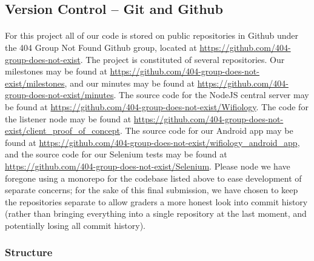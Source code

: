 \documentclass[]{article}
\begin{document}
	\subsection{Version Control -- Git and Github}
	\paragraph{} For this project all of our code is stored on public repositories in Github under the 404 Group Not Found
	Github group, located at \href{https://github.com/404-group-does-not-exist}{https://github.com/404-group-does-not-exist}.
	The project is constituted of several repositories. Our milestones may be found at \href{https://github.com/404-group-does-not-exist/milestones}{https://github.com/404-group-does-not-exist/milestones}, and our minutes may be found at 
	\href{https://github.com/404-group-does-not-exist/minutes}{https://github.com/404-group-does-not-exist/minutes}. The source
	code for the NodeJS central server may be found at \href{https://github.com/404-group-does-not-exist/Wifiology}{https://github.com/404-group-does-not-exist/Wifiology}. The code for the listener node may be found at \href{https://github.com/404-group-does-not-exist/client\_proof\_of\_concept}{https://github.com/404-group-does-not-exist/client\_proof\_of\_concept}. The source code for our Android app
	may be found at \href{https://github.com/404-group-does-not-exist/wifiology\_android\_app}{https://github.com/404-group-does-not-exist/wifiology\_android\_app}, and the source code for our Selenium tests may be found at \href{https://github.com/404-group-does-not-exist/Selenium}{https://github.com/404-group-does-not-exist/Selenium}. Please node we have foregone using a monorepo for the codebase listed 
	above to ease development of separate concerns; for the sake of this final submission, we have chosen to keep the repositories 
	separate to allow graders a more honest look into commit history (rather than bringing everything into a single repository at the
	last moment, and potentially losing all commit history).
	
	\subsubsection{Structure}
\end{document}
